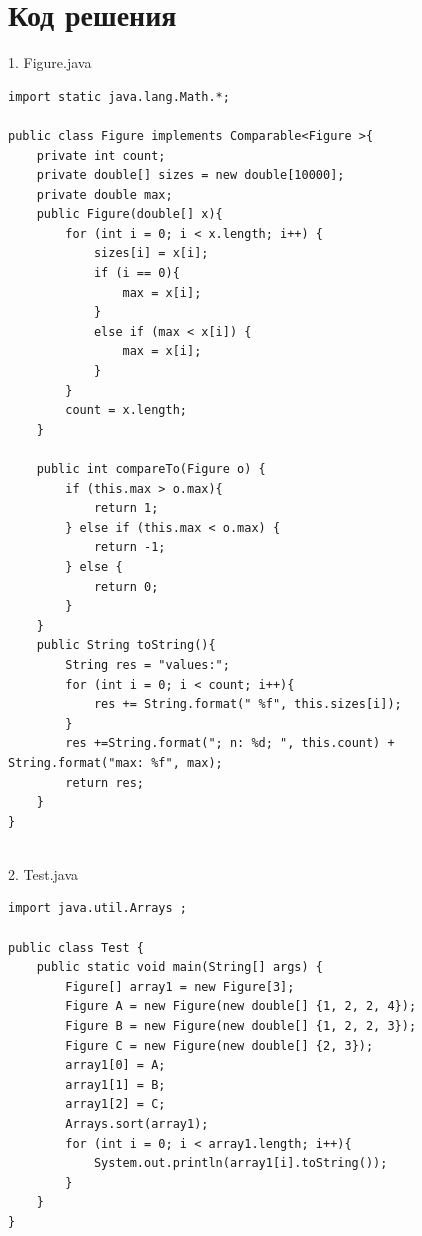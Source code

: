 \documentclass[a4paper, 12pt]{extarticle}
\begin{document}
\section{Код решения}
1. Figure.java
\begin{verbatim}
import static java.lang.Math.*;

public class Figure implements Comparable<Figure >{
    private int count;
    private double[] sizes = new double[10000];
    private double max;
    public Figure(double[] x){
        for (int i = 0; i < x.length; i++) {
            sizes[i] = x[i];
            if (i == 0){
                max = x[i];
            }
            else if (max < x[i]) {
                max = x[i];
            }
        }
        count = x.length;
    }

    public int compareTo(Figure o) {
        if (this.max > o.max){
            return 1;
        } else if (this.max < o.max) {
            return -1;
        } else {
            return 0;
        }
    }
    public String toString(){
        String res = "values:";
        for (int i = 0; i < count; i++){
            res += String.format(" %f", this.sizes[i]);
        }
        res +=String.format("; n: %d; ", this.count) + String.format("max: %f", max);
        return res;
    }
}
  
\end{verbatim}
2. Test.java
\begin{verbatim}
import java.util.Arrays ;

public class Test {
    public static void main(String[] args) {
        Figure[] array1 = new Figure[3];
        Figure A = new Figure(new double[] {1, 2, 2, 4});
        Figure B = new Figure(new double[] {1, 2, 2, 3});
        Figure C = new Figure(new double[] {2, 3});
        array1[0] = A;
        array1[1] = B;
        array1[2] = C;
        Arrays.sort(array1);
        for (int i = 0; i < array1.length; i++){
            System.out.println(array1[i].toString());
        }
    }
}
  
\end{verbatim}
\end{document}
